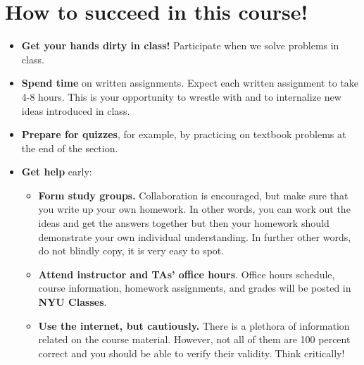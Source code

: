 \documentclass[10pt]{article}
\theoremstyle{definition}
\begin{document}
\section*{How to succeed in this course!}
\begin{itemize}
\item \textbf{Get your hands dirty in class!}  Participate when we solve problems in class.

\item \textbf{Spend time} on written assignments.  Expect each written assignment to take 4-8 hours.  This is your opportunity to wrestle with and to internalize new ideas introduced in class.

\item \textbf{Prepare for quizzes}, for example, by practicing on textbook problems at the end of the section.

\item \textbf{Get help} early:
\begin{itemize}
\item \textbf{Form study groups.} Collaboration is encouraged, but make sure that you write up your own homework.  In other words, you can work out the ideas and get the answers together but then your homework should demonstrate your own individual understanding. In further other words, do not blindly copy, it is very easy to spot.
\item \textbf{Attend instructor and TAs' office hours}.  Office hours schedule, course information, homework assignments, and grades will be posted in \textbf{NYU Classes}.
\item \textbf{Use the internet, but cautiously.} There is a plethora of information related on the course material. However, not all of them are 100 percent correct and you should be able to verify their validity. Think critically!

%

\end{itemize}
\end{itemize}
\end{document}
